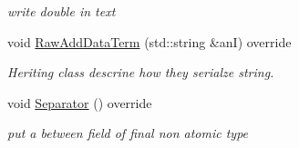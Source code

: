 \begin{DoxyCompactItemize}
\begin{DoxyCompactList}\small\item\em write double in text \end{DoxyCompactList}\item 
void \hyperlink{classMMVII_1_1cOXml__Ar2007_a2fb4da1d14c641e603c0dcbe6d5dddba}{Raw\+Add\+Data\+Term} (std\+::string \&anI) override\hypertarget{classMMVII_1_1cOXml__Ar2007_a2fb4da1d14c641e603c0dcbe6d5dddba}{}\label{classMMVII_1_1cOXml__Ar2007_a2fb4da1d14c641e603c0dcbe6d5dddba}

\begin{DoxyCompactList}\small\item\em Heriting class descrine how they serialze string. \end{DoxyCompactList}\item 
void \hyperlink{classMMVII_1_1cOXml__Ar2007_aa2751d0eef5cf05d9ee057751ac6219f}{Separator} () override\hypertarget{classMMVII_1_1cOXml__Ar2007_aa2751d0eef5cf05d9ee057751ac6219f}{}\label{classMMVII_1_1cOXml__Ar2007_aa2751d0eef5cf05d9ee057751ac6219f}

\begin{DoxyCompactList}\small\item\em put a \textquotesingle{} \textquotesingle{} between field of final non atomic type \end{DoxyCompactList}\end{DoxyCompactItemize}
